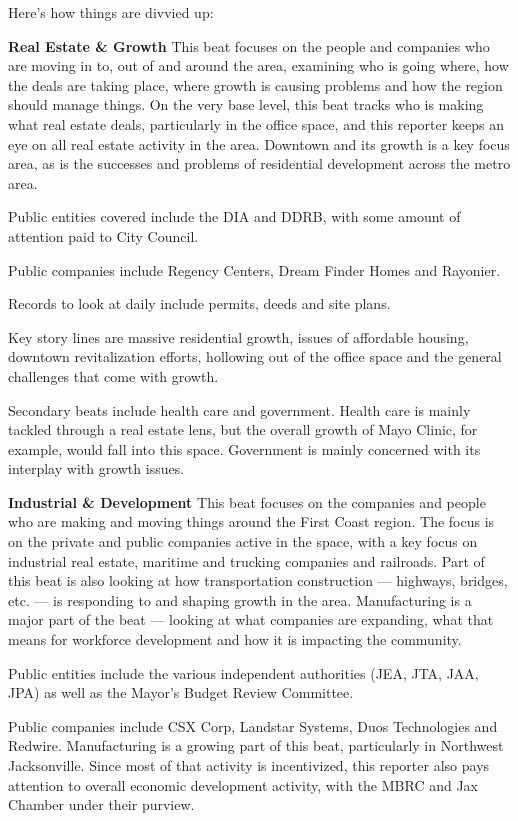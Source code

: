 \documentclass[
  11pt,
  american,
  letterpaperpaper,
  extrafontsizes,onecolumn,openright
  ]{memoir}
\begin{document}
Here's how things are divvied up:

\newpage

\textbf{Real Estate \& Growth}
This beat focuses on the people and companies who are moving in to, out of and around the area, examining who is going where, how the deals are taking place, where growth is causing problems and how the region should manage things. On the very base level, this beat tracks who is making what real estate deals, particularly in the office space, and this reporter keeps an eye on all real estate activity in the area. Downtown and its growth is a key focus area, as is the successes and problems of residential development across the metro area.

Public entities covered include the DIA and DDRB, with some amount of attention paid to City Council.

Public companies include Regency Centers, Dream Finder Homes and Rayonier.

Records to look at daily include permits, deeds and site plans.

Key story lines are massive residential growth, issues of affordable housing, downtown revitalization efforts, hollowing out of the office space and the general challenges that come with growth.

Secondary beats include health care and government. Health care is mainly tackled through a real estate lens, but the overall growth of Mayo Clinic, for example, would fall into this space. Government is mainly concerned with its interplay with growth issues.

\textbf{Industrial \& Development}
This beat focuses on the companies and people who are making and moving things around the First Coast region. The focus is on the private and public companies active in the space, with a key focus on industrial real estate, maritime and trucking companies and railroads. Part of this beat is also looking at how transportation construction --- highways, bridges, etc. --- is responding to and shaping growth in the area. Manufacturing is a major part of the beat --- looking at what companies are expanding, what that means for workforce development and how it is impacting the community.

Public entities include the various independent authorities (JEA, JTA, JAA, JPA) as well as the Mayor's Budget Review Committee.

Public companies include CSX Corp, Landstar Systems, Duos Technologies and Redwire. Manufacturing is a growing part of this beat, particularly in Northwest Jacksonville. Since most of that activity is incentivized, this reporter also pays attention to overall economic development activity, with the MBRC and Jax Chamber under their purview.
\end{document}
